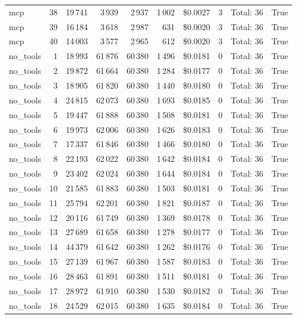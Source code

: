 \documentclass[a4paper,11pt]{article}
\begin{document}
\begin{table}[H]
{\begin{tabular}{l r r r r r r r l r}
mcp & 38 & 19\,741 & 3\,939 & 2\,937 & 1\,002 & \$0.0027 & 3 & Total: 36 & True \\
mcp & 39 & 16\,184 & 3\,618 & 2\,987 & 631 & \$0.0020 & 3 & Total: 36 & True \\
mcp & 40 & 14\,003 & 3\,577 & 2\,965 & 612 & \$0.0020 & 3 & Total: 36 & True \\
\midrule
no\_tools & 1 & 18\,993 & 61\,876 & 60\,380 & 1\,496 & \$0.0181 & 0 & Total: 36 & True \\
no\_tools & 2 & 19\,872 & 61\,664 & 60\,380 & 1\,284 & \$0.0177 & 0 & Total: 36 & True \\
no\_tools & 3 & 18\,905 & 61\,820 & 60\,380 & 1\,440 & \$0.0180 & 0 & Total: 36 & True \\
no\_tools & 4 & 24\,815 & 62\,073 & 60\,380 & 1\,693 & \$0.0185 & 0 & Total: 36 & True \\
no\_tools & 5 & 19\,447 & 61\,888 & 60\,380 & 1\,508 & \$0.0181 & 0 & Total: 36 & True \\
no\_tools & 6 & 19\,973 & 62\,006 & 60\,380 & 1\,626 & \$0.0183 & 0 & Total: 36 & True \\
no\_tools & 7 & 17\,337 & 61\,846 & 60\,380 & 1\,466 & \$0.0180 & 0 & Total: 36 & True \\
no\_tools & 8 & 22\,193 & 62\,022 & 60\,380 & 1\,642 & \$0.0184 & 0 & Total: 36 & True \\
no\_tools & 9 & 23\,402 & 62\,024 & 60\,380 & 1\,644 & \$0.0184 & 0 & Total: 36 & True \\
no\_tools & 10 & 21\,585 & 61\,883 & 60\,380 & 1\,503 & \$0.0181 & 0 & Total: 36 & True \\
no\_tools & 11 & 25\,794 & 62\,201 & 60\,380 & 1\,821 & \$0.0187 & 0 & Total: 36 & True \\
no\_tools & 12 & 20\,116 & 61\,749 & 60\,380 & 1\,369 & \$0.0178 & 0 & Total: 36 & True \\
no\_tools & 13 & 27\,689 & 61\,658 & 60\,380 & 1\,278 & \$0.0177 & 0 & Total: 36 & True \\
no\_tools & 14 & 44\,379 & 61\,642 & 60\,380 & 1\,262 & \$0.0176 & 0 & Total: 36 & True \\
no\_tools & 15 & 27\,139 & 61\,967 & 60\,380 & 1\,587 & \$0.0183 & 0 & Total: 36 & True \\
no\_tools & 16 & 28\,463 & 61\,891 & 60\,380 & 1\,511 & \$0.0181 & 0 & Total: 36 & True \\
no\_tools & 17 & 28\,972 & 61\,910 & 60\,380 & 1\,530 & \$0.0182 & 0 & Total: 36 & True \\
no\_tools & 18 & 24\,529 & 62\,015 & 60\,380 & 1\,635 & \$0.0184 & 0 & Total: 36 & True \\

\end{tabular}}
\end{table}
\end{document}
